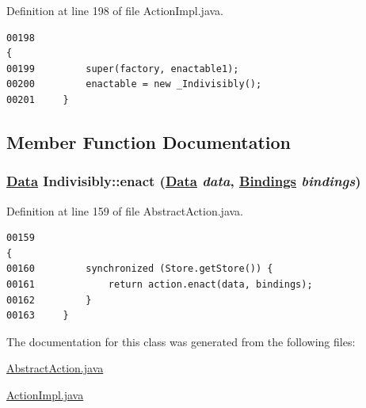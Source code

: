 Definition at line 198 of file Action\-Impl.java.\footnotesize\begin{verbatim}00198                                                                   {
00199         super(factory, enactable1);
00200         enactable = new _Indivisibly();
00201     }
\end{verbatim}\normalsize 


\subsection{Member Function Documentation}
\hypertarget{classIndivisibly_a1}{
\subsubsection[enact]{\setlength{\rightskip}{0pt plus 5cm}\hyperlink{interfaceData}{Data} Indivisibly::enact (\hyperlink{interfaceData}{Data} {\em data}, \hyperlink{interfaceBindings}{Bindings} {\em bindings})}}
\label{classIndivisibly_a1}




Definition at line 159 of file Abstract\-Action.java.\footnotesize\begin{verbatim}00159                                                                                {
00160         synchronized (Store.getStore()) {
00161             return action.enact(data, bindings);
00162         }
00163     }
\end{verbatim}\normalsize 


The documentation for this class was generated from the following files:\begin{CompactItemize}
\item 
\hyperlink{AbstractAction_8java-source}{Abstract\-Action.java}\item 
\hyperlink{ActionImpl_8java-source}{Action\-Impl.java}\end{CompactItemize}
